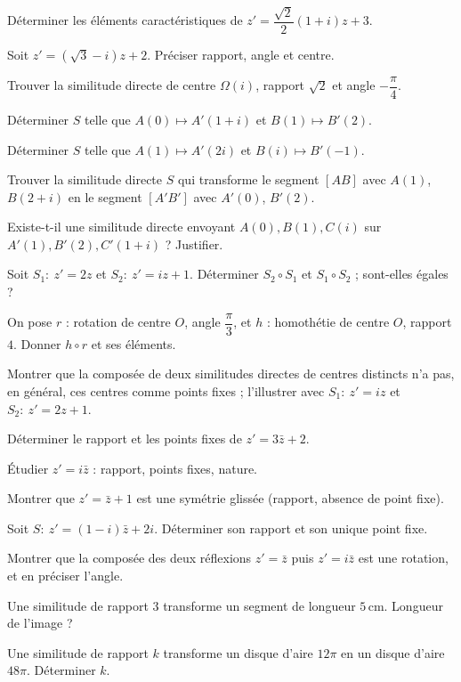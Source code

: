 \exo{} Déterminer les éléments caractéristiques de $z'=\dfrac{\sqrt2}{2}(1+i)z+3$.

\exo{} Soit $z'=(\sqrt3-i)z+2$. Préciser rapport, angle et centre.

\exo{} Trouver la similitude directe de centre $\Omega(i)$, rapport $\sqrt2$ et angle $-\dfrac\pi4$.

\exo{} Déterminer $S$ telle que $A(0)\mapsto A'(1+i)$ et $B(1)\mapsto B'(2)$.

\exo{} Déterminer $S$ telle que $A(1)\mapsto A'(2i)$ et $B(i)\mapsto B'(-1)$.

\exo{} Trouver la similitude directe $S$ qui transforme le segment $[AB]$ avec $A(1)$, $B(2+i)$
en le segment $[A'B']$ avec $A'(0)$, $B'(2)$.

\exo{} Existe-t-il une similitude directe envoyant $A(0),B(1),C(i)$ sur $A'(1),B'(2),C'(1+i)$ ? Justifier.

\exo{} Soit $S_1:\ z'=2z$ et $S_2:\ z'=iz+1$. Déterminer $S_2\circ S_1$ et $S_1\circ S_2$ ; sont-elles égales ?

\exo{} On pose $r$ : rotation de centre $O$, angle $\dfrac\pi3$, et $h$ : homothétie de centre $O$, rapport $4$.
Donner $h\circ r$ et ses éléments.

\exo{} Montrer que la composée de deux similitudes directes de centres distincts n'a pas, en général, ces
centres comme points fixes ; l'illustrer avec $S_1:\ z'=iz$ et $S_2:\ z'=2z+1$.

\exo{} Déterminer le rapport et les points fixes de $z'=3\bar z+2$.

\exo{} Étudier $z'=i\bar z$ : rapport, points fixes, nature.

\exo{} Montrer que $z'=\bar z+1$ est une symétrie glissée (rapport, absence de point fixe).

\exo{} Soit $S:\ z'=(1-i)\bar z+2i$. Déterminer son rapport et son unique point fixe.

\exo{} Montrer que la composée des deux réflexions $z'=\bar z$ puis $z'=i\bar z$ est une rotation, et en
préciser l'angle.

\exo{} Une similitude de rapport $3$ transforme un segment de longueur $5\,$cm. Longueur de l'image ?

\exo{} Une similitude de rapport $k$ transforme un disque d'aire $12\pi$ en un disque d'aire $48\pi$.
Déterminer $k$.

